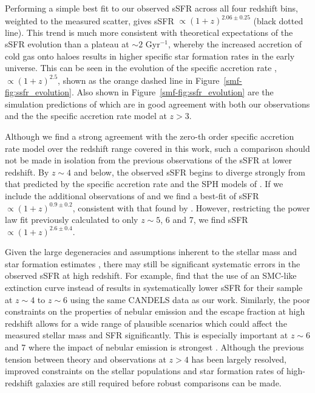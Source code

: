 Performing a simple best fit to our observed sSFR across all four redshift bins, weighted to the measured scatter, gives sSFR $\propto (1 + z)^{2.06 \pm 0.25}$ (black dotted line). This trend is much more consistent with theoretical expectations of the sSFR evolution than a plateau at $\sim 2$ Gyr$^{-1}$, whereby the increased accretion of cold gas onto haloes results in higher specific star formation rates in the early universe. This can be seen in the evolution of the specific accretion rate \citep{Neistein:2007fg,Dekel:2013id}, $\propto (1 + z)^{2.5}$, shown as the orange dashed line in Figure~\ref{smf-fig:ssfr_evolution}. Also shown in Figure~\ref{smf-fig:ssfr_evolution} are the simulation predictions of \citet{Dave:2013bf} which are in good agreement with both our observations and the the specific accretion rate model at $z > 3$. 

Although we find a strong agreement with the zero-th order specific accretion rate model over the redshift range covered in this work, such a comparison should not be made in isolation from the previous observations of the sSFR at lower redshift. By $z \sim 4$ and below, the observed sSFR begins to diverge strongly from that predicted by the specific accretion rate and the SPH models of \citet{Dave:2013bf}. If we include the additional observations of \citet{2007ApJ...670..156D} and \citet{2012ApJ...754...25R} we find a best-fit of sSFR $\propto (1 + z)^{0.9 \pm 0.2}$, consistent with that found by \citet{2014ApJ...781...34G}. However, restricting the power law fit previously calculated to only $z \sim 5$, 6 and 7, we find sSFR $\propto (1 + z)^{2.6 \pm 0.4}$.

Given the large degeneracies and assumptions inherent to the stellar mass and star formation estimates \citep{deBarros:2014fa,2013A&A...549A...4S}, there may still be significant systematic errors in the observed sSFR at high redshift. For example, \citet{2015ApJ...799..183S} find that the use of an SMC-like extinction curve instead of \citet{2000ApJ...533..682C} results in systematically lower sSFR for their sample at $z \sim 4$ to $z \sim 6$ using the same CANDELS data as our work. Similarly, the poor constraints on the properties of nebular emission and the escape fraction at high redshift allows for a wide range of plausible scenarios which could affect the measured stellar mass and SFR significantly. This is especially important at $z \sim 6$ and 7 where the impact of nebular emission is strongest \citep{Stark:2013ix,2014ApJ...784...58S,2014ApJ...781...34G}. Although the previous tension between theory and observations at $z > 4$ has been largely resolved, improved constraints on the stellar populations and star formation rates of high-redshift galaxies are still required before robust comparisons can be made. 

